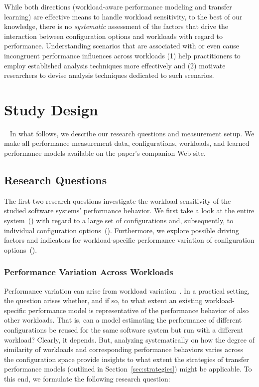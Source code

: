 {While both directions (workload-aware performance modeling and transfer learning) are effective means to handle workload sensitivity, to the best of our knowledge, there is no \textit{systematic} assessment of the factors that drive the interaction between configuration options and workloads with regard to performance. Understanding scenarios that are associated with or even cause incongruent performance influences across workloads (1) help practitioners to employ established analysis techniques more effectively and (2) motivate researchers to devise analysis techniques dedicated to such scenarios.

\section{Study Design}~\label{sec:study}
In what follows, we describe our research questions and measurement setup. We make all performance measurement data, configurations, workloads, and learned performance models available on the paper's companion Web site.

\subsection{Research Questions}
The first two research questions investigate the workload sensitivity of the studied software systems' performance behavior. We first take a look at the entire system~() with regard to a large set of configurations and, subsequently, to individual configuration options~(). Furthermore, we explore possible driving factors and indicators for workload-specific performance variation of configuration options~().

\subsubsection{Performance Variation Across Workloads}
Performance variation can arise from workload variation~\cite{benchmarking_book}. In a practical setting, the question arises whether, and if so, to what extent an existing workload-specific performance model is representative of the performance behavior of also other workloads. 
That is, can a model estimating the performance of different configurations be reused for the same software system but run with a different workload? 
Clearly, it depends. But, analyzing systematically on how the degree of similarity of workloads and corresponding performance behaviors varies across the configuration space provide insights to what extent the strategies of transfer performance models (outlined in Section~\ref{sec:strategies}) might be applicable.
To this end, we formulate the following research question: 

}
